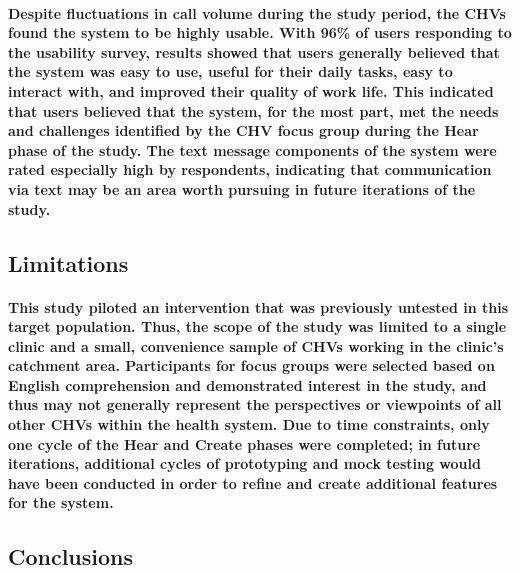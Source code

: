 \paragraph{Despite fluctuations in call volume during the study period, the CHVs found the system to be highly usable. With 96\% of users responding to the usability survey, results showed that users generally believed that the system was easy to use, useful for their daily tasks, easy to interact with, and improved their quality of work life. This indicated that users believed that the system, for the most part, met the needs and challenges identified by the CHV focus group during the Hear phase of the study. The text message components of the system were rated especially high by respondents, indicating that communication via text may be an area worth pursuing in future iterations of the study.}

\subsection{Limitations}
\paragraph{This study piloted an intervention that was previously untested in this target population. Thus, the scope of the study was limited to a single clinic and a small, convenience sample of CHVs working in the clinic's catchment area. Participants for focus groups were selected based on English comprehension and demonstrated interest in the study, and thus may not generally represent the perspectives or viewpoints of all other CHVs within the health system. Due to time constraints, only one cycle of the Hear and Create phases were completed; in future iterations, additional cycles of prototyping and mock testing would have been conducted in order to refine and create additional features for the system.} 

%

\subsection{Conclusions}
